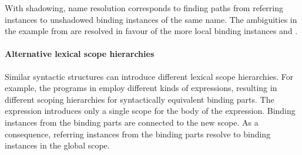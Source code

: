 With shadowing, name resolution corresponds to 
  finding paths from referring instances to unshadowed binding instances of the same name.
The ambiguities in the example from  are
  resolved in favour of the more local binding instances 
     and
    .

\paragraph{Alternative lexical scope hierarchies}

Similar syntactic structures can introduce different lexical scope hierarchies.
For example, 
  the programs in  employ different kinds of  expressions,
    resulting in different scoping hierarchies for syntactically equivalent binding parts.
The  expression introduces only a single scope  
  for the body of the expression.
Binding instances  
  from the binding parts are connected to the new scope.
As a consequence, referring instances  
  from the binding parts resolve to binding instances  
  in the global scope.

